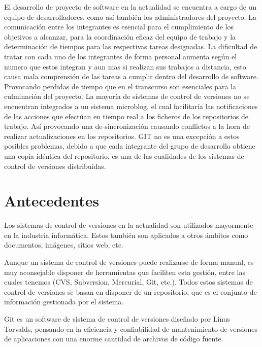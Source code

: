 \documentclass[letterpaper, 12pt,double,graphicx,caption,rotating]{report}
\begin{document}
\begin{titlepage}
El desarrollo de proyecto de software en la actualidad se encuentra a cargo de un equipo de desarrolladores, como así también los administradores del proyecto.
La comunicación entre los integrantes es esencial para el cumplimiento de los objetivos a alcanzar, para la coordinación eficaz del equipo de trabajo y la determinación de tiempos para las respectivas tareas designadas.
La dificultad de tratar con cada uno de los integrantes de forma personal aumenta según el numero que estos integran y aun mas si realizan sus trabajos a distancia, esto causa mala comprensión de las tareas a cumplir dentro del desarrollo de software. Provocando perdidas de tiempo que en el transcurso son esenciales para la culminación del proyecto.
La mayoría de sistemas de control de versiones no se encuentran integrados a un sistema microblog, el cual facilitaría las notificaciones de las acciones que efectúan en tiempo real a los ficheros de los repositorios de trabajo. Así provocando una de-sincronización causando conflictos a la hora de realizar actualizaciones en los repositorios.
GIT no es una excepción a estos posibles problemas, debido a que cada integrante del grupo de desarrollo obtiene una copia idéntica del repositorio, es una de las cualidades de los sistemas de control de versiones distribuidas.

\end{titlepage}
\newpage
\tableofcontents






\section{Antecedentes}
Los sistemas de control de versiones en la actualidad son utilizados mayormente en la industria informática. Estos también son aplicados a otros ámbitos como documentos, imágenes, sitios web, etc.

Aunque un sistema de control de versiones puede realizarse de forma manual, es muy aconsejable disponer de herramientas que faciliten esta gestión, entre las cuales tenemos (CVS, Subversion, Mercurial, Git, etc.). Todos estos sistemas de control de versiones se basan en disponer de un repositorio, que es el conjunto de información gestionada por el sistema.

Git es un software de sistema de control de versiones diseñado por Linus Torvalds, pensando en la eficiencia y confiabilidad de mantenimiento de versiones de aplicaciones con una enorme cantidad de archivos de código fuente.
\end{document}
